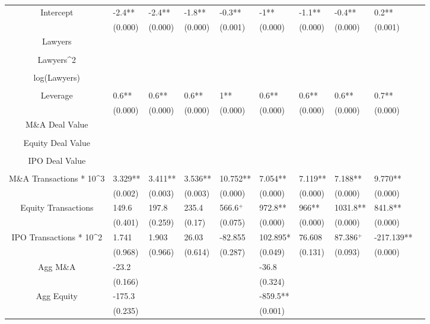 \documentclass{article}
\begin{document}
\begin{table}[H]
\begin{tabular}{|clllllllll|}
Intercept & -2.4** & -2.4** & -1.8** & -0.3** & -1** & -1.1** & -0.4** & 0.2** & \\
   & (0.000) & (0.000) & (0.000) & (0.001) & (0.000) & (0.000) & (0.000) & (0.001) & \\
  Lawyers &  &  &  &  &  &  &  &  & \\
   &  &  &  &  &  &  &  &  & \\
  Lawyers^2 &  &  &  &  &  &  &  &  & \\
   &  &  &  &  &  &  &  &  & \\
  log(Lawyers) &  &  &  &  &  &  &  &  & \\
   &  &  &  &  &  &  &  &  & \\
  Leverage & 0.6** & 0.6** & 0.6** & 1** & 0.6** & 0.6** & 0.6** & 0.7** & \\
   & (0.000) & (0.000) & (0.000) & (0.000) & (0.000) & (0.000) & (0.000) & (0.000) & \\
  M\&A Deal Value &  &  &  &  &  &  &  &  & \\
   &  &  &  &  &  &  &  &  & \\
  Equity Deal Value &  &  &  &  &  &  &  &  & \\
   &  &  &  &  &  &  &  &  & \\
  IPO Deal Value &  &  &  &  &  &  &  &  & \\
   &  &  &  &  &  &  &  &  & \\
  M\&A Transactions * 10^3 & 3.329** & 3.411** & 3.536** & 10.752** & 7.054** & 7.119** & 7.188** & 9.770** & \\
   & (0.002) & (0.003) & (0.003) & (0.000) & (0.000) & (0.000) & (0.000) & (0.000) & \\
  Equity Transactions & 149.6 & 197.8 & 235.4 & 566.6$^{+}$ & 972.8** & 966** & 1031.8** & 841.8** & \\
   & (0.401) & (0.259) & (0.17) & (0.075) & (0.000) & (0.000) & (0.000) & (0.000) & \\
  IPO Transactions * 10^2 & 1.741 & 1.903 & 26.03 & -82.855 & 102.895* & 76.608 & 87.386$^{+}$ & -217.139** & \\
   & (0.968) & (0.966) & (0.614) & (0.287) & (0.049) & (0.131) & (0.093) & (0.000) & \\
  Agg M\&A & -23.2 &  &  &  & -36.8 &  &  &  & \\
   & (0.166) &  &  &  & (0.324) &  &  &  & \\
  Agg Equity & -175.3 &  &  &  & -859.5** &  &  &  & \\
   & (0.235) &  &  &  & (0.001) &  &  &  & \\

\end{tabular}
\end{table}
\end{document}

